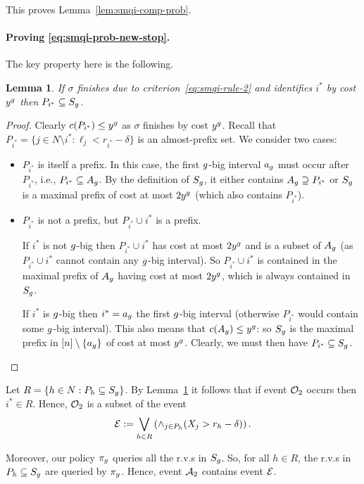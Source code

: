 \documentclass[11pt]{article}
\newtheorem{lem}[thm]{Lemma}
\theoremstyle{remark}
\theoremstyle{plain}
\theoremstyle{remark}
\begin{document}
This proves Lemma~\ref{lem:smqi-comp-prob}. 


\paragraph{Proving \eqref{eq:smqi-prob-new-stop}.}  The key property here is the following.
\begin{lem}\label{lem:smqi-stop-S}
    If $\sigma$ finishes due to criterion~\eqref{eq:smqi-rule-2} and identifies $i^*$ by cost  $y^g$  then $P_{i^*}\subseteq S_g$.
\end{lem}
\begin{proof}
 Clearly $c(P_{i^*})\le y^g$ as $\sigma$ finishes by cost $y^g$.   Recall that $P_{i^*}=\{ j\in N\setminus i^* : \ell_j < r_{i^*} - \delta\}$ is an  almost-prefix set. We consider two cases:
    \begin{itemize}
        \item $P_{i^*}$ is itself a prefix. In this case, the first $g$-big interval $a_g$ must occur after $P_{i^*}$, i.e., $P_{i^*}\subseteq A_g$. By the definition of $S_g$, it either contains $A_g\supseteq P_{i^*}$ or $S_g$ is a maximal prefix of cost at most $2y^g$ (which also contains $P_{i^*}$). 
        \item $P_{i^*}$ is not  a prefix, but $P_{i^*} \cup i^*$ is a prefix. 
        
        If $i^*$ is not $g$-big then $P_{i^*} \cup i^*$ has cost at most $2 y^g$ and is a subset of $A_g$ (as $P_{i^*} \cup i^*$  cannot contain any $g$-big interval). So $P_{i^*} \cup i^*$   is contained in the maximal prefix of $A_g$ having cost at most $2y^g$, which is always contained in $S_g$.
    
    If $i^*$ is $g$-big then $i^*=a_g$ the first $g$-big interval (otherwise $P_{i^*}$ would contain some $g$-big interval). This also means that   $c(A_g)\le y^g$: so $S_g$ is the maximal prefix in $[n]\setminus \{a_g\}$ of cost at most $y^g$. Clearly, we must then have $P_{i^*}\subseteq S_g$.
    \end{itemize}
\end{proof}

Let $R=\{h\in N: P_h \subseteq S_g\}$. By Lemma~\ref{lem:smqi-stop-S} it follows that if event ${\cal O}_2$ occurs then  $i^*\in R$. Hence, ${\cal O}_2$ 
is a subset of the event
$${\cal E} := \bigvee_{h\in R}  \left( \wedge_{j\in P_h} (X_j > r_h-\delta)\right) .$$



Moreover, our  policy $\pi_g$ queries all the r.v.s in $S_g$. So, for all $h\in R$, the r.v.s in $P_h\subseteq S_g$ are queried by $\pi_g$. Hence,  event ${\cal A}_2$  
contains event ${\cal E}$.
\end{document}
